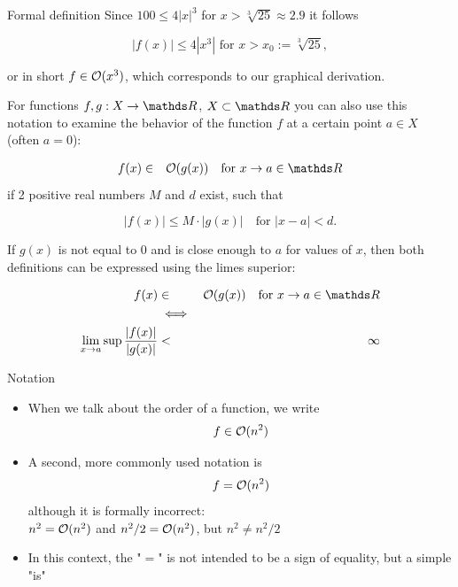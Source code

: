 \documentclass[11pt,compress,t,notes=noshow, xcolor=table]{beamer}
\begin{document}
\begin{vbframe}{Formal definition}
Since $100 \le 4 |x|^3$ for $x > \sqrt[3]{25} \approx 2.9$ it follows

$$
|f(x)| \le 4 |x^3| \text{  for  } x > x_0 := \sqrt[3]{25},
$$

or in short $f \in \mathcal{O}(x^3)$, which corresponds to our graphical derivation.


\framebreak

For functions $f, g: X \to \R$, $X\subset \R$ you can also use this notation to examine the behavior of the function $f$ at a certain point $a \in X$ (often $a=0$):

\begin{eqnarray*}
  f(x) &\in& \order(g(x)) \quad \text{for } x \to a \in \R \\
\end{eqnarray*}
if 2 positive real numbers $M$ and $d$ exist, such that

$$
|f(x)| \leq M \cdot |g(x)| \quad \text{for } |x-a| < d.
$$

\framebreak

  If $g(x)$ is not equal to 0 and is close enough to $a$ for values of $x$, then both definitions can be expressed using the limes superior:

\begin{eqnarray*}
  f(x) &\in& \order(g(x)) \quad \text{for } x \to a \in \R \\
  &\iff& \\
  \lim_{x \rightarrow a} \sup \frac{|f(x)|}{|g(x)|} &<& \infty\\
\end{eqnarray*}

\end{vbframe}

\begin{vbframe}{Notation}

  \begin{itemize}
    \item When we talk about the order of a function, we write
    $$f \in \mathcal{O}(n^2)$$
    \item A second, more commonly used notation is
        $$f = \mathcal{O}(n^2)$$
        although it is formally incorrect:\\
    $n^2 = \mathcal{O}(n^2)$ and $n^2/2 = \mathcal{O}(n^2)$, but $n^2 \neq n^2/2$
    \item In this context, the "$=$" is not intended to be a sign of equality, but a simple "is"
  \end{itemize}
\end{vbframe}
\end{document}
